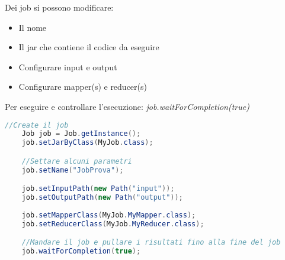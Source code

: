 Dei job si possono modificare:
\begin{itemize}
    \item Il nome 
    \item Il jar che contiene il codice da eseguire 
    \item Configurare input e output
    \item Configurare mapper(s) e reducer(s)
\end{itemize}

Per eseguire e controllare l'esecuzione: \textit{job.waitForCompletion(true)}

\begin{lstlisting}[language=Java]
    //Create il job 
    Job job = Job.getInstance();
    job.setJarByClass(MyJob.class);

    //Settare alcuni parametri
    job.setName("JobProva");

    job.setInputPath(new Path("input"));
    job.setOutputPath(new Path("output"));
    
    job.setMapperClass(MyJob.MyMapper.class);
    job.setReducerClass(MyJob.MyReducer.class);

    //Mandare il job e pullare i risultati fino alla fine del job
    job.waitForCompletion(true);
\end{lstlisting}